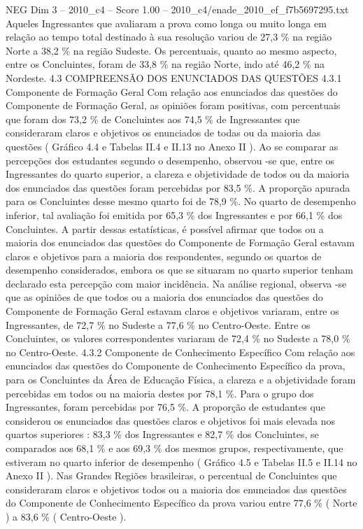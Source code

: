\begin{textsample}{NEG Dim 3 – 2010\_c4 – Score 1.00 – 2010\_c4/enade\_2010\_ef\_f7b5697295.txt}
Aqueles Ingressantes que avaliaram a prova como longa ou muito longa em relação ao tempo total destinado à sua resolução variou de 27,3 \% na região Norte a 38,2 \% na região Sudeste.
Os percentuais, quanto ao mesmo aspecto, entre os Concluintes, foram de 33,8 \% na região Norte, indo até 46,2 \% na Nordeste. 4.3 COMPREENSÃO DOS ENUNCIADOS DAS QUESTÕES 4.3.1 Componente de Formação Geral Com relação aos enunciados das questões do Componente de Formação Geral, as opiniões foram positivas, com percentuais que foram dos 73,2 \% de Concluintes aos 74,5 \% de Ingressantes que consideraram claros e objetivos os enunciados de todas ou da maioria das questões ( Gráfico 4.4 e Tabelas II.4 e II.13 no Anexo II ).
Ao se comparar as percepções dos estudantes segundo o desempenho, observou -se que, entre os Ingressantes do quarto superior, a clareza e objetividade de todos ou da maioria dos enunciados das questões foram percebidas por 83,5 \%.
A proporção apurada para os Concluintes desse mesmo quarto foi de 78,9 \%.
No quarto de desempenho inferior, tal avaliação foi emitida por 65,3 \% dos Ingressantes e por 66,1 \% dos Concluintes.
A partir dessas estatísticas, é possível afirmar que todos ou a maioria dos enunciados das questões do Componente de Formação Geral estavam claros e objetivos para a maioria dos respondentes, segundo os quartos de desempenho considerados, embora os que se situaram no quarto superior tenham declarado esta percepção com maior incidência.
Na análise regional, observa -se que as opiniões de que todos ou a maioria dos enunciados das questões do Componente de Formação Geral estavam claros e objetivos variaram, entre os Ingressantes, de 72,7 \% no Sudeste a 77,6 \% no Centro-Oeste.
Entre os Concluintes, os valores correspondentes variaram de 72,4 \% no Sudeste a 78,0 \% no Centro-Oeste. 4.3.2 Componente de Conhecimento Específico Com relação aos enunciados das questões do Componente de Conhecimento Específico da prova, para os Concluintes da Área de Educação Física, a clareza e a objetividade foram percebidas em todos ou na maioria destes por 78,1 \%.
Para o grupo dos Ingressantes, foram percebidas por 76,5 \%.
A proporção de estudantes que considerou os enunciados das questões claros e objetivos foi mais elevada nos quartos superiores : 83,3 \% dos Ingressantes e 82,7 \% dos Concluintes, se comparados aos 68,1 \% e aos 69,3 \% dos mesmos grupos, respectivamente, que estiveram no quarto inferior de desempenho ( Gráfico 4.5 e Tabelas II.5 e II.14 no Anexo II ).
Nas Grandes Regiões brasileiras, o percentual de Concluintes que consideraram claros e objetivos todos ou a maioria dos enunciados das questões do Componente de Conhecimento Específico da prova variou entre 77,6 \% ( Norte ) a 83,6 \% ( Centro-Oeste ).

\end{textsample}
